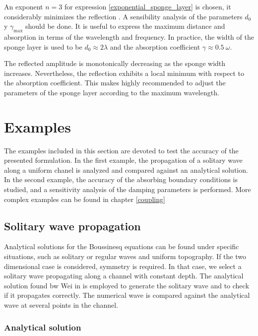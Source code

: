 An exponent $n=3$ for expression \ref{exponential_sponge_layer} is chosen, it considerably minimizes the reflection \cite{carmigniani2018}. A sensibility analysis of the parameters $d_0$ y $\gamma_{\max}$ should be done.
It is useful to express the maximum distance and absorption in terms of the wavelength and frequency. In practice, the width of the sponge layer is used to be $d_0 \approx 2\lambda$ and the absorption coefficient $\gamma \approx 0.5\ \omega$.

The reflected amplitude is monotonically decreasing as the sponge width increases. Nevertheless, the reflection exhibits a local minimum with respect to the absorption coefficient. This makes highly recommended to adjust the parameters of the sponge layer according to the  maximum wavelength.




\section{Examples}


The examples included in this section are devoted to test the accuracy of the presented formulation. In the first example, the propagation of a solitary wave along a uniform chanel is analyzed and compared against an analytical solution. In the second example, the accuracy of the absorbing boundary conditions is studied, and a sensitivity analysis of the damping parameters is performed. More complex examples can be found in chapter \ref{coupling} 


\subsection{Solitary wave propagation}


Analytical solutions for the Boussinesq equations can be found under specific situations, such as solitary or regular waves and uniform topography. If the two dimensional case is considered, symmetry is required. In that case, we select a solitary wave propagating along a channel with constant depth. The analytical solution found bw Wei in \cite{wei1995} is employed to generate the solitary wave and to check if it propagates correctly. The numerical wave is compared against the analytical wave at several points in the channel.


\subsubsection{Analytical solution}

